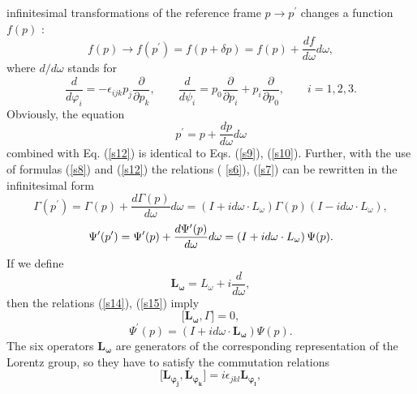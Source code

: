 \documentclass[a4paper,a4paper]{article}
\begin{document}
infinitesimal transformations of the reference frame $p\rightarrow p^{\prime
}$ changes a function $f(p)$ : 
\begin{equation}
f(p)\rightarrow f(p^{\prime })=f(p+\delta p)=f(p)+\frac{df}{d\omega }d\omega
,  \label{s11}
\end{equation}%
where $d/d\omega $ stands for 
\begin{equation}
\frac{d}{d\varphi _{i}}=-\epsilon _{ijk}p_{j}\frac{\partial }{\partial p_{k}}%
,\qquad \frac{d}{d\psi _{i}}=p_{0}\frac{\partial }{\partial p_{i}}+p_{i}%
\frac{\partial }{\partial p_{0}},\qquad i=1,2,3.  \label{s12}
\end{equation}%
Obviously, the equation 
\begin{equation}
p^{\prime }=p+\frac{dp}{d\omega }d\omega  \label{s13}
\end{equation}%
combined with Eq. (\ref{s12}) is identical to Eqs. (\ref{s9}), (\ref{s10}).
Further, with the use of formulas (\ref{s8}) and (\ref{s12}) the relations (%
\ref{s6}), (\ref{s7}) can be rewritten in the infinitesimal form 
\begin{equation}
\Gamma (p^{\prime })=\Gamma (p)+\frac{d\Gamma (p)}{d\omega }d\omega =\left(
I+id\omega \cdot L_{\omega }\right) \Gamma (p)\left( I-id\omega \cdot
L_{\omega }\right) ,  \label{s14}
\end{equation}%
\begin{equation}
\Psi ^{\prime }(p^{\prime })=\Psi ^{\prime }(p)+\frac{d\Psi ^{\prime }(p)}{%
d\omega }d\omega =\left( I+id\omega \cdot L_{\omega }\right) \Psi (p).
\label{s15}
\end{equation}%
If we define 
\begin{equation}
\mathbf{L_{\omega }}=L_{\omega }+i\frac{d}{d\omega },  \label{s16}
\end{equation}%
then the relations (\ref{s14}), (\ref{s15}) imply 
\begin{equation}
\lbrack \mathbf{L_{\omega }},\Gamma ]=0,  \label{s17}
\end{equation}%
\begin{equation}
\Psi ^{\prime }(p)=\left( I+id\omega \cdot \mathbf{L_{\omega }}\right) \Psi
(p).  \label{s18}
\end{equation}%
The six operators $\mathbf{L_{\omega }}$ are generators of the corresponding
representation of the Lorentz group, so they have to satisfy the commutation
relations 
\begin{equation}
\lbrack \mathbf{L_{\varphi _{j}}},\mathbf{L_{\varphi _{k}}}]=i\epsilon _{jkl}%
\mathbf{L_{\varphi _{l}},}  \label{s19}
\end{equation}%
\end{document}
